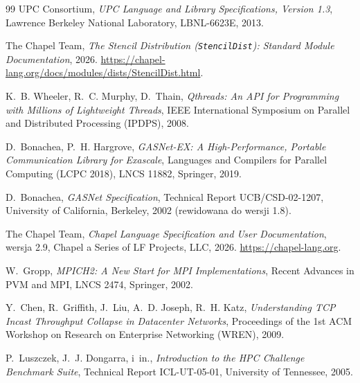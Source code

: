 \begin{thebibliography}{99}
UPC Consortium,
\emph{UPC Language and Library Specifications, Version 1.3},
Lawrence Berkeley National Laboratory, LBNL-6623E, 2013.

The Chapel Team,
\emph{The Stencil Distribution (\texttt{StencilDist}): Standard Module Documentation},
2026. \url{https://chapel-lang.org/docs/modules/dists/StencilDist.html}.

K.~B. Wheeler, R.~C. Murphy, D.~Thain,
\emph{Qthreads: An API for Programming with Millions of Lightweight Threads},
IEEE International Symposium on Parallel and Distributed Processing (IPDPS), 2008.

D.~Bonachea, P.~H. Hargrove,
\emph{GASNet-EX: A High-Performance, Portable Communication Library for Exascale},
Languages and Compilers for Parallel Computing (LCPC 2018),
LNCS 11882, Springer, 2019.

D.~Bonachea,
\emph{GASNet Specification},
Technical Report UCB/CSD-02-1207, University of California, Berkeley, 2002
(rewidowana do wersji 1.8).

The Chapel Team,
\emph{Chapel Language Specification and User Documentation}, wersja 2.9,
Chapel a Series of LF Projects, LLC, 2026. \url{https://chapel-lang.org}.

W.~Gropp,
\emph{MPICH2: A New Start for MPI Implementations},
Recent Advances in PVM and MPI, LNCS 2474, Springer, 2002.

Y.~Chen, R.~Griffith, J.~Liu, A.~D. Joseph, R.~H. Katz,
\emph{Understanding TCP Incast Throughput Collapse in Datacenter Networks},
Proceedings of the 1st ACM Workshop on Research on Enterprise Networking (WREN), 2009.

P.~Luszczek, J.~J. Dongarra, i~in.,
\emph{Introduction to the HPC Challenge Benchmark Suite},
Technical Report ICL-UT-05-01, University of Tennessee, 2005.

\end{thebibliography}
